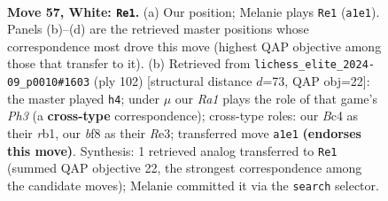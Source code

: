 \documentclass[11pt]{article}
\begin{document}
\clearpage

\begin{figure}[p]\centering
\begin{subfigure}{0.46\textwidth}\centering
\resizebox{\linewidth}{!}{%
\newchessgame
\chessboard[
  setfen={5b1r/p4nkp/P7/7r/2B2B2/1Pp3KP/R1P3P1/R7 w - - 21 57},
  showmover=false,
  pgfstyle=straightmove, color=movearrow, markmove={a1-e1}
]}
\caption{}
\end{subfigure}\hfill
\begin{subfigure}{0.46\textwidth}\centering
\resizebox{\linewidth}{!}{%
\newchessgame
\chessboard[
  setfen={8/6kp/1p3rb1/1B6/P7/4R1PP/4RP1K/1r6 w - - 1 52},
  showmover=false,
  pgfstyle=straightmove, color=movearrow, markmove={h3-h4}
]}
\caption{}
\end{subfigure}
\\[4pt]

\caption{\textbf{Move 57, White: \texttt{Re1}.} (a) Our position; Melanie plays \texttt{Re1} (\texttt{a1e1}). Panels (b)--(d) are the retrieved master positions whose correspondence most drove this move (highest QAP objective among those that transfer to it). (b) Retrieved from \texttt{lichess\_elite\_2024-09\_p0010\#1603} (ply 102) [structural distance $d$=73, QAP obj=22]: the master played \texttt{h4}; under $\mu$ our \emph{Ra1} plays the role of that game's \emph{Ph3} (a \textbf{cross-type} correspondence); cross-type roles: our \emph{B}c4 as their \emph{r}b1, our \emph{b}f8 as their \emph{R}e3; transferred move \texttt{a1e1} \textbf{(endorses this move)}. Synthesis: 1 retrieved analog transferred to \texttt{Re1} (summed QAP objective 22, the strongest correspondence among the candidate moves); Melanie committed it via the \texttt{search} selector.}
\label{fig:thought-m112}
\end{figure}

\clearpage
\end{document}
